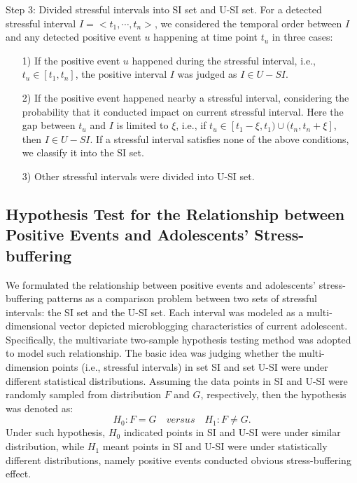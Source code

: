 Step 3: Divided stressful intervals into SI set and U-SI set.
For a detected stressful interval $I = <t_1,\cdots,t_n>$, we considered the temporal order between $I$ and any detected positive event $u$ happening at time point $t_u$ in three cases:
\begin{itemize}
\item[1)] If the positive event $u$ happened during the stressful interval, i.e., $t_u \in [t_1,t_n]$, the positive interval $I$ was judged as $I \in U-SI$.
\vspace{-0.3cm}
\item[2)] If the positive event happened nearby a stressful interval,
considering the probability that it conducted impact on current stressful interval.
Here the gap between $t_u$ and $I$ is limited to $\xi$, i.e.,
if $t_u \in [t_{1}-\xi, t_1)\cup(t_{n},t_{n}+\xi]$, then $I \in U-SI$.
If a stressful interval satisfies none of the above conditions, we classify it into the SI set.
\vspace{-0.3cm}
\item[3)] Other stressful intervals were divided into U-SI set.
\end{itemize}

\subsection{Hypothesis Test for the Relationship between Positive Events and Adolescents' Stress-buffering}
\label{sec:frame2}
We formulated the relationship between positive events and adolescents' stress-buffering patterns
as a comparison problem between two sets of stressful intervals: the SI set and the U-SI set.
Each interval was modeled as a multi-dimensional vector depicted microblogging characteristics of current adolescent.
Specifically, the multivariate two-sample hypothesis testing method
\cite{Li2017Correlating,Johnson2012Applied} was adopted to model such relationship.
The basic idea was judging whether the multi-dimension points (i.e., stressful intervals)
in set SI and set U-SI were under different statistical distributions.
Assuming the data points in SI and U-SI were randomly sampled from distribution $F$ and $G$, respectively,
then the hypothesis was denoted as:
\begin{equation}
H_0: F = G \quad versus \quad H_1: F \neq G.
\end{equation}
Under such hypothesis,
$H_0$ indicated points in SI and U-SI were under similar distribution,
while $H_1$ meant points in SI and U-SI were under statistically different distributions,
namely positive events conducted obvious stress-buffering effect.

